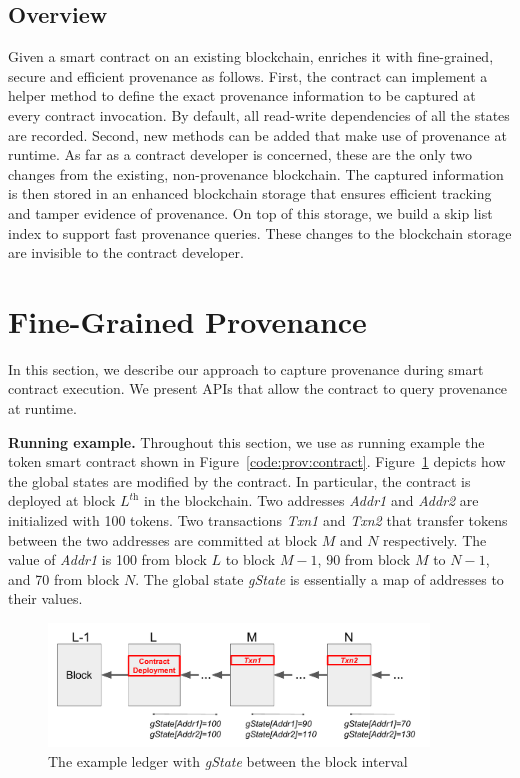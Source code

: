 \subsection{\fs Overview}
Given a smart contract on an existing blockchain, {\fs} enriches it with fine-grained, secure and
efficient provenance as follows. First, the contract can implement a helper
method to define the exact provenance information to be captured at every contract invocation. By default, all
read-write dependencies of all the states are recorded. Second, new methods can be added that make use of
provenance at runtime. As far as a contract developer is concerned, these are the only two changes from the
existing, non-provenance blockchain. The captured information is then stored in an enhanced blockchain storage
that ensures efficient tracking and tamper evidence of provenance.  On top of this storage, we build a skip
list index to support fast provenance queries.  These changes to the blockchain storage are invisible to the
contract developer.    


\section{Fine-Grained Provenance}
\label{sec:provenance:capture}
In this section, we describe our approach to capture provenance during smart contract execution. We present
APIs that allow the contract to query provenance at runtime. 

\textbf{Running example.} Throughout this section, we use as running example the token smart contract  
shown in Figure~\ref{code:prov:contract}. Figure~\ref{diagram:prov:ledger} depicts how the global states are modified by the contract. In particular, the contract is deployed at block $L^\textit{th}$ in the blockchain. Two addresses
\textit{Addr1} and \textit{Addr2} are initialized with 100 tokens. Two transactions \textit{Txn1} and
\textit{Txn2} that transfer tokens between the two addresses are committed at block $M$ and $N$ respectively.
The value of \textit{Addr1} is 100 from block $L$ to block $M-1$, $90$ from block $M$ to $N-1$, and 70
from block $N$. The global state {\em gState} is essentially a map of addresses to their values. 

\begin{figure}
  \centering
  \includegraphics[width=0.9\textwidth]{diagram/provenance/contract.pdf}
  \caption{The example ledger with \textit{gState} between the block interval}
  \label{diagram:prov:ledger}
\end{figure}


